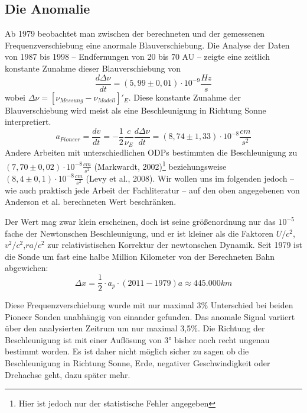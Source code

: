 
\subsection{Die Anomalie}
Ab 1979 beobachtet man zwischen der berechneten und der gemessenen Frequenzverschiebung eine anormale Blauverschiebung.
Die Analyse der Daten von 1987 bis 1998 – Endfernungen von 20 bis 70 AU – zeigte eine zeitlich konstante Zunahme dieser
Blauverschiebung von
\begin{equation}
  \frac{d\Delta\nu}{dt}=(5,99\pm0,01)\cdot10^{-9}\frac{Hz}{s}
\end{equation}
wobei $\Delta\nu=[\nu_{Messung}-\nu_{Modell}]'_E$. Diese konstante Zunahme der Blauverschiebung wird meist als eine
Beschleunigung in Richtung Sonne interpretiert.
\begin{equation}
  a_{Pioneer}=\frac{dv}{dt}=-\frac{1}{2}\frac{c}{\nu_E}\frac{d\Delta\nu}{dt} = (8,74\pm1,33)\cdot10^{-8}\frac{cm}{s^2}
\end{equation}
Andere Arbeiten mit unterschiedlichen ODPs bestimmten die Beschleunigung zu $(7,70
\pm0,02)\cdot10^{-8}\frac{cm}{s^2}$ (Markwardt,
2002)\footnote{Hier ist jedoch nur der statistische Fehler angegeben}\cite{Markwardt2002} beziehungsweise
$(8,4\pm0,1)\cdot10^{-8}\frac{cm}{s^2}$ (Levy et al., 2008)\cite{Levy2008}.
Wir wollen uns im folgenden jedoch – wie auch praktisch jede Arbeit der Fachliteratur – auf den oben angegebenen von
Anderson et al. berechneten Wert beschränken.

Der Wert mag zwar klein erscheinen, doch ist seine größenordnung nur das $10^{-5}$ fache der Newtonschen Beschleunigung,
und er ist kleiner als die Faktoren $U/c^2$,$v^2/c^2$,$r a/c^2$ zur relativistischen Korrektur der newtonschen Dynamik.
Seit 1979 ist die Sonde um fast eine halbe Million Kilometer von der Berechneten Bahn abgewichen:
\begin{equation}
  \Delta x= \frac12 \cdot a_p \cdot (2011-1979) a\approx 445.000 km
\end{equation}

Diese Frequenzverschiebung wurde mit nur maximal 3\% Unterschied bei beiden Pioneer Sonden unabhängig von einander
gefunden. Das anomale Signal variiert über den analysierten Zeitrum um nur maximal 3,5\%. Die Richtung der
Beschleunigung ist mit einer Auflösung von 3° bisher noch recht ungenau bestimmt worden. Es ist daher nicht möglich
sicher zu sagen ob die Beschleunigung
in Richtung Sonne, Erde, negativer Geschwindigkeit oder Drehachse geht, dazu später mehr.
